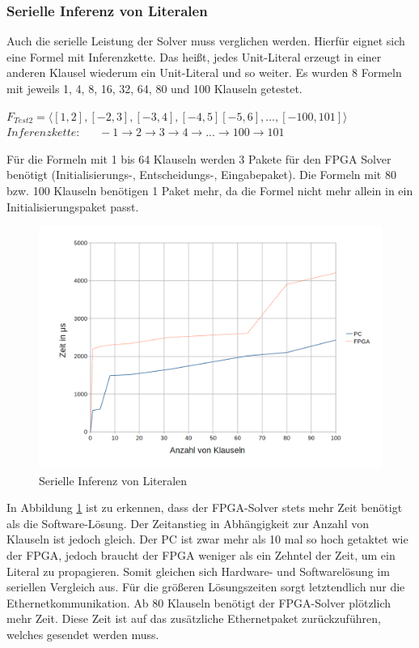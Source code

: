 \subsubsection{Serielle Inferenz von Literalen}
Auch die serielle Leistung der Solver muss verglichen werden.
Hierfür eignet sich eine Formel mit Inferenzkette. Das heißt, jedes
Unit-Literal erzeugt in einer anderen Klausel wiederum ein Unit-Literal und so weiter.
Es wurden 8 Formeln mit jeweils 1, 4, 8, 16, 32, 64, 80 und
100 Klauseln getestet. 
    \begin{center}
      $F_{Test2} = \langle [1,2],[-2,3],[-3,4],[-4,5][-5,6],...,[-100,101]\rangle$\\
      $Inferenzkette:\ \ \ \ \ \ \ -1 \rightarrow 2 \rightarrow 3 \rightarrow 4 \rightarrow ... \rightarrow 100 \rightarrow 101$
    \end{center}
Für die Formeln mit 1 bis 64 Klauseln
werden 3 Pakete für den FPGA Solver benötigt (Initialisierungs-, Entscheidungs-, Eingabepaket).
Die Formeln mit 80 bzw. 100 Klauseln benötigen 1 Paket
mehr, da die Formel nicht mehr allein in ein Initialisierungspaket passt.
\begin{figure}[h]
  \includegraphics[width=\textwidth]{abb/testfall2.png}
  \caption{Serielle Inferenz von Literalen}
  \label{seriellinferenz}
\end{figure}
In Abbildung \ref{seriellinferenz} ist zu erkennen, dass der FPGA-Solver stets mehr
Zeit benötigt als die Software-Lösung. Der Zeitanstieg in
Abhängigkeit zur Anzahl von Klauseln ist jedoch gleich. Der PC ist zwar
mehr als 10 mal so hoch getaktet wie der FPGA, jedoch braucht der
FPGA weniger als ein Zehntel der Zeit, um ein Literal zu propagieren.
Somit gleichen sich Hardware- und Softwarelösung im seriellen Vergleich
aus. Für die größeren Lösungszeiten sorgt letztendlich nur
die Ethernetkommunikation. Ab 80 Klauseln benötigt der FPGA-Solver
plötzlich mehr Zeit. Diese Zeit ist auf das zusätzliche
Ethernetpaket zurückzuführen, welches gesendet werden muss.


